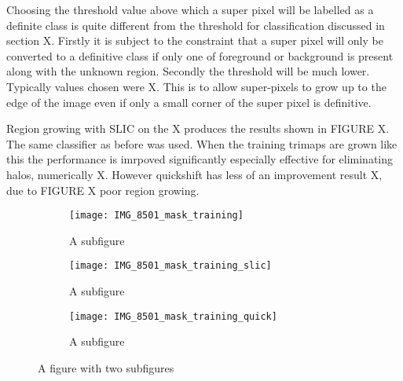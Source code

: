 \documentclass[12pt]{IIBproject}
\begin{document}
Choosing the threshold value above which a super pixel will be labelled as a definite class is quite different from the threshold for classification discussed in section X. Firstly it is subject to the constraint that a super pixel will only be converted to a definitive class if only one of foreground or background is present along with the unknown region. Secondly the threshold will be much lower. Typically values chosen were X. This is to allow super-pixels to grow up to the edge of the image even if only a small corner of the super pixel is definitive.

Region growing with SLIC on the X produces the results shown in FIGURE X. The same classifier as before was used. When the training trimaps are grown like this the performance is imrpoved significantly especially effective for eliminating halos, numerically X. However quickshift has less of an improvement result X, due to FIGURE X poor region growing.
\begin{figure}[H]
\centering
\begin{subfigure}{.45\textwidth}
  \centering
  \texttt{[image: IMG\_8501\_mask\_training]}
  \caption{A subfigure}
  \label{fig:sub1}
\end{subfigure}%
\begin{subfigure}{.45\textwidth}
  \centering
  \texttt{[image: IMG\_8501\_mask\_training\_slic]}
  \caption{A subfigure}
  \label{fig:sub2}
\end{subfigure}
\begin{subfigure}{.45\textwidth}
  \centering
  \texttt{[image: IMG\_8501\_mask\_training\_quick]}
  \caption{A subfigure}
  \label{fig:sub2}
\end{subfigure}

\caption{A figure with two subfigures}
\label{fig:test}
\end{figure}
\end{document}
